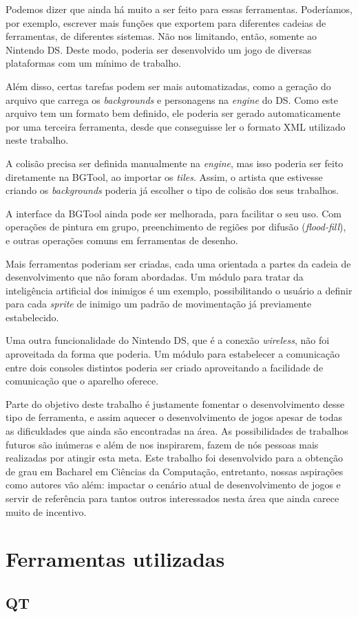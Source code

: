 \documentclass[brazil]{abnt}
\begin{document}
Podemos dizer que ainda há muito a ser feito para essas ferramentas. Poderíamos, por exemplo, escrever mais funções que exportem para diferentes cadeias de ferramentas, de diferentes sistemas. Não nos limitando, então, somente ao Nintendo DS. Deste modo, poderia ser desenvolvido um jogo de diversas plataformas com um mínimo de trabalho.

Além disso, certas tarefas podem ser mais automatizadas, como a geração do arquivo que carrega os \textit{backgrounds} e personagens na \textit{engine} do DS. Como este arquivo tem um formato bem definido, ele poderia ser gerado automaticamente por uma terceira ferramenta, desde que conseguisse ler o formato XML utilizado neste trabalho.


A colisão precisa ser definida manualmente na \textit{engine}, mas isso poderia ser feito diretamente na BGTool, ao importar os \textit{tiles}. Assim, o artista que estivesse criando os \textit{backgrounds} poderia já escolher o tipo de colisão dos seus trabalhos.

A interface da BGTool ainda pode ser melhorada, para facilitar o seu uso. Com operações de pintura em grupo, preenchimento de regiões por difusão (\textit{flood-fill}), e outras operações comuns em ferramentas de desenho.

Mais ferramentas poderiam ser criadas, cada uma orientada a partes da cadeia de desenvolvimento que não foram abordadas. Um módulo para tratar da inteligência artificial dos inimigos é um exemplo, possibilitando o usuário a definir para cada \textit{sprite} de inimigo um padrão de movimentação já previamente estabelecido.

Uma outra funcionalidade do Nintendo DS, que é a conexão \textit{wireless}, não foi aproveitada da forma que poderia. Um módulo para estabelecer a comunicação entre dois consoles distintos poderia ser criado aproveitando a facilidade de comunicação que o aparelho oferece.

Parte do objetivo deste trabalho é justamente fomentar o desenvolvimento desse tipo de ferramenta, e assim aquecer o desenvolvimento de jogos apesar de todas as dificuldades que ainda são encontradas na área. As possibilidades de trabalhos futuros são inúmeras e além de nos inspirarem, fazem de nós pessoas mais realizadas por atingir esta meta. Este trabalho foi desenvolvido para a obtenção de grau em Bacharel em Ciências da Computação, entretanto, nossas aspirações como autores vão além: impactar o cenário atual de desenvolvimento de jogos e servir de referência para tantos outros interessados nesta área que ainda carece muito de incentivo.





\anexo

\chapter{Ferramentas utilizadas}

\section{QT}
\end{document}
